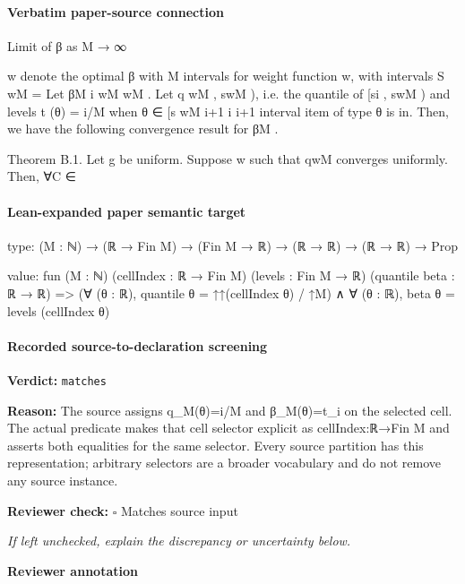 \documentclass[10pt]{article}
\newcommand{\reviewerbox}{%
  \par\noindent\fbox{\parbox{0.96\linewidth}{\rule{0pt}{0.38in}}}\par
}
\newcommand{\reviewmatch}[1]{%
  \par\noindent\textbf{Reviewer check:} $\square$\; #1\par
  \noindent\emph{If left unchecked, explain the discrepancy or uncertainty below.}\par
}
\begin{document}
\paragraph{Verbatim paper-source connection}
\begin{ReviewVerbatim}
Limit of β as M → ∞

w denote the optimal β with M intervals for weight function w, with intervals {S wM } =
Let βM
i
wM
wM . Let q
wM , swM ), i.e. the quantile of
{[si , swM
)}
and
levels
t
(θ)
=
i/M
when
θ
∈
[s
wM
i+1
i
i+1
interval item of type θ is in.
Then, we have the following convergence result for βM .

Theorem B.1. Let g be uniform. Suppose w such that qwM converges uniformly. Then, ∀C ∈
\end{ReviewVerbatim}



\paragraph{Lean-expanded paper semantic target}
\begin{ReviewVerbatim}
type:
(M : ℕ) → (ℝ → Fin M) → (Fin M → ℝ) → (ℝ → ℝ) → (ℝ → ℝ) → Prop

value:
fun (M : ℕ) (cellIndex : ℝ → Fin M) (levels : Fin M → ℝ) (quantile beta : ℝ → ℝ) =>
  (∀ (θ : ℝ), quantile θ = ↑↑(cellIndex θ) / ↑M) ∧ ∀ (θ : ℝ), beta θ = levels (cellIndex θ)
\end{ReviewVerbatim}


\paragraph{Recorded source-to-declaration screening}
\textbf{Verdict:} \texttt{matches}
\\
{\raggedright
\textbf{Reason:} The source assigns q\_\allowbreak{}M(θ)=i/\allowbreak{}M and β\_\allowbreak{}M(θ)=t\_\allowbreak{}i on the selected cell.\allowbreak{} The actual predicate makes that cell selector explicit as cellIndex:\allowbreak{}ℝ→Fin M and asserts both equalities for the same selector.\allowbreak{} Every source partition has this representation;\allowbreak{} arbitrary selectors are a broader vocabulary and do not remove any source instance.\allowbreak{}
\par}
\reviewmatch{Matches source input}
\noindent\textbf{Reviewer annotation}\par
\reviewerbox
\clearpage
\hypertarget{paper-prerequisite-51b089a52fad3653}{}
\end{document}
